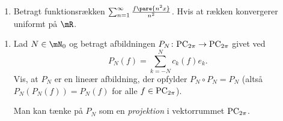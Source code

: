 \begin{opg}
\begin{enumerate}
    \iffalse\begin{proof}[Løsning]
    Lad $k\in\mZ\setminus\{0\}$. Da haves
    $$ c_k = \intFourier{\pare{x+2}e^{-ikx}} =
    \intFourier{xe^{-ikx}} + 2\intFourier{e^{-ikx}}
    = i\frac{\pare{-1}^k}{k}, $$
    og $c_0 = 2$. Fourierrækken for $g$ er således 
    $$ 2 + \sum_{k=1}^\infty i\frac{\pare{-1}^k}{k}\pare{e^{ikx} - e^{-ikx}} $$
    \end{proof}\fi
    
    \item Betragt funktionsrækken $\sum_{n=1}^\infty \frac{f\pare{n^2x}}{n^2}$. Hvis at rækken konvergerer uniformt på $\mR$.
    
    \iffalse\begin{proof}[Løsning]
    Bemærk først, at $\abs{f\pare{n^2x}} \leq \pi$ for alle $x\in\mR$. Det følger såledesaf MC 5.12, at rækken
    $$ \sum_{n=1}^\infty \frac{f\pare{n^2x}}{n^2} $$
    er uniformt konvergent på hele $\mR$, eftersom $\sum_{n=1}^\infty \frac{1}{n^2}$ er konvergent.
    \end{proof}\fi
\end{enumerate}
\end{opg}

\begin{opg}[Ekstraopgave]\hfill
\begin{enumerate}
	\item Lad $N \in \mN_0$ og betragt afbildningen $P_N\colon \textup{PC}_{2\pi}\to\textup{PC}_{2 \pi}$ givet ved 
	$$ P_N( f)= \sum_{k=-N}^N c_k(f) e_k. $$
	Vis, at $P_N$ er en lineær afbildning, der opfylder $P_N \circ P_N = P_N$ (altså $P_N(P_N(f)) = P_N(f)$ for alle $f\in\textup{PC}_{2\pi}$).  
	
	Man kan tænke på $P_N$ som en \textit{projektion} i vektorrummet $\textup{PC}_{2\pi} $. 
	
	\iffalse\begin{proof}[Løsning]
	Lad $\alpha,\beta\in\mC$ og $f,g\in \text{PC}_{2\pi}$. Da haves
	\begin{align*}
	    P_N\pare{\alpha f + \beta g}
	    = \sum_{k=-N}^N c_k\pare{\alpha f + \beta g}e_k
	    &= \sum_{k=-N}^N \pare{\frac{1}{2\pi}\int_{-\pi}^\pi \pare{\alpha f\pare{x} + \beta g\pare{x}}e^{-ikx} \, dx} e_k \\
	    &= \sum_{k=-N}^N \pare{\alpha\frac{1}{2\pi}\int_{-\pi}^\pi f\pare{x}e^{-ikx} \, dx  + \beta \frac{1}{2\pi}\int_{-\pi}^\pi g\pare{x}e^{-ikx} \, dx} e_k \\
	    &= \sum_{k=-N}^N \pare{\alpha c_k\pare{f}  + \beta c_k\pare{g}} e_k \\
	    &= \alpha\sum_{k=-N}^N c_k\pare{f}e_k 
	        + \beta\sum_{k=-N}^N c_k\pare{g} e_k \\
	    &= \alpha P_N\pare{f} + \beta P_N\pare{g},
	\end{align*}
	hvilket viser $P_N$ er lineær. For at vise, at $P_N^2 = P_N$, bemærk
	$$ P_N^2\pare{f} = P_N\pare{\sum_{k=-N}^N c_k\pare{f}e_k}
        = \sum_{k=-N}^N c_k\pare{f} P_N\pare{e_k} 
        = \sum_{k=-N}^N c_k\pare{f} e_k = P_N\pare{f}, $$
    hvilket er det ønskede.
	\end{proof}\fi
	\end{enumerate}
\end{opg}


